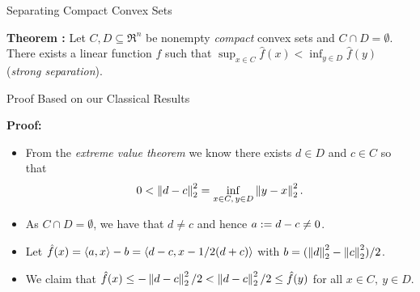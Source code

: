 \documentclass[9pt]{beamer}
\begin{document}
\begin{frame}{Separating Compact Convex Sets}

  \textbf{Theorem :} Let $C, D \subseteq \Re^n$ be nonempty \emph{compact} convex sets and $C\cap D=\emptyset$. There exists a linear function $\hat f$ such that $\sup_{x\in C}\hat f(x) < \inf_{y\in D}\hat f(y)$ (\emph{strong separation}).

  \vfill

  \begin{center}
    
  \end{center}
  
\end{frame}

\begin{frame}{Proof Based on our Classical Results}

  \textbf{Proof:}

  \begin{itemize}
  \item 
    From the \emph{extreme value theorem} we know there exists $d\in D$ and $c \in C$ so that
    \begin{equation}
      \label{eq:minimum_distance}
      0<\left\|d-c\right\|^2_2 = \inf_{x\in C,\,y\in D}\left\|y-x\right\|^2_2.
    \end{equation}
  \item<2->
    As $C\cap D=\emptyset$, we have that $d\neq c$ and hence $a:= d-c\neq 0$.
  \item<3-> Let $\hat f(x) = \left<a, x\right>-b = \left<d-c, x-1/2(d+c)\right>$ with $b = {(\left\|d\right\|^2_2-\left\|c\right\|^2_2)}/{2}$.
  \item<4-> We claim that $\hat f(x) \leq -\left\|d-c\right\|_2^2/2 < \left\|d-c\right\|_2^2/2 \leq \hat f(y)$ for all $x\in C,~y\in D$.
  \end{itemize}
\end{frame}
\end{document}
